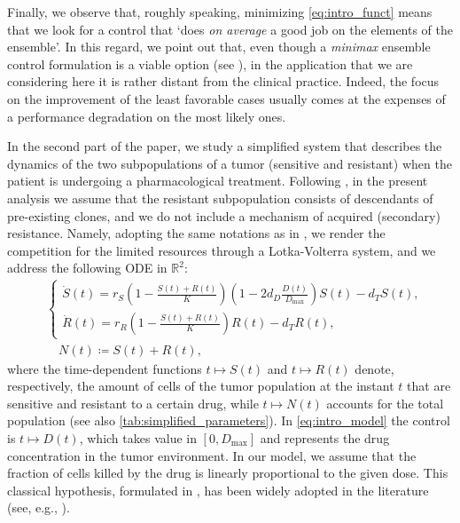 \documentclass[a4paper,12pt, reqno]{amsart}
\theoremstyle{plain}
\theoremstyle{definition}
\theoremstyle{remark}
\numberwithin{equation}{section}
\newcommand{\R}{\mathbb{R}}
\begin{document}
{Finally, we observe that,} roughly speaking, minimizing \eqref{eq:intro_funct} means that we look for a control that `does \emph{on average} a good job on the elements of the ensemble'.
In this regard, we point out that, even though a \emph{minimax} ensemble control formulation is a viable option (see \cite{Scag25}), in the application that we are considering here it is rather distant from the clinical practice. Indeed, the focus on the improvement of the least favorable cases usually comes at the expenses of a performance degradation on the most likely ones.

{In the second part of the paper}, we study a {simplified} system that describes the {dynamics} of the two sub\-populations of a tumor (sensitive and resistant) when the patient is undergoing a pharmacological treatment. {Following \cite{cunningham2018optimal,turnover2021}, in the present analysis we assume that the resistant sub\-population consists of descendants of pre-existing clones, and we do not include a mechanism of acquired (secondary) resistance.}
Namely, adopting the same notations as in \cite{turnover2021}, we render the competition for the limited resources through a Lotka-Volterra system, and we address the following ODE in $\R^2$:
\begin{equation}\label{eq:intro_model}
\begin{split}
    &\begin{cases}
        \dot S(t) = r_S\left( 1 - \frac{S(t)+R(t)}{K} \right)\left( 1 - 2d_D\frac{D(t)}{D_{\max}} \right)S(t) - d_T S(t), \\
    \dot R(t) = r_R\left( 1 - \frac{S(t)+R(t)}{K} \right) R(t) - d_T R(t),
    \end{cases}
    \\ 
    & \quad N(t) \coloneqq S(t) + R(t),
\end{split}
\end{equation}
where the time-dependent functions $t\mapsto S(t)$ and $t\mapsto R(t)$ denote, respectively, the amount of cells of the tumor population at the instant $t$ that are sensitive and resistant to a certain drug, while $t\mapsto N(t)$ accounts for the total population {(see also \cref{tab:simplified_parameters})}.
In \cref{eq:intro_model} the control is $t\mapsto D(t)$, which takes value in $[0,D_{\max}]$ and represents the drug concentration in the tumor environment. In our model, we assume that the fraction of cells killed by the drug is linearly proportional to the given dose. This classical hypothesis, formulated in \cite{NortonSimon77}, has been widely adopted in the literature (see, e.g., \cite{schattler2015optimal,turnover2021}).
\end{document}
